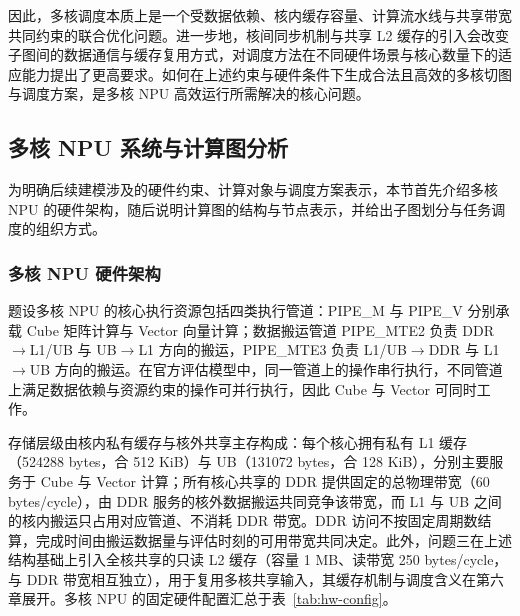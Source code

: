 因此，多核调度本质上是一个受数据依赖、核内缓存容量、计算流水线与共享带宽共同约束的联合优化问题。进一步地，核间同步机制与共享 L2 缓存的引入会改变子图间的数据通信与缓存复用方式，对调度方法在不同硬件场景与核心数量下的适应能力提出了更高要求。如何在上述约束与硬件条件下生成合法且高效的多核切图与调度方案，是多核 NPU 高效运行所需解决的核心问题。

\subsection{多核 NPU 系统与计算图分析}
为明确后续建模涉及的硬件约束、计算对象与调度方案表示，本节首先介绍多核 NPU 的硬件架构，随后说明计算图的结构与节点表示，并给出子图划分与任务调度的组织方式。

\subsubsection{多核 NPU 硬件架构}
题设多核 NPU 的核心执行资源包括四类执行管道：PIPE\_M 与 PIPE\_V 分别承载 Cube 矩阵计算与 Vector 向量计算；数据搬运管道 PIPE\_MTE2 负责 DDR$\rightarrow$L1/UB 与 UB$\rightarrow$L1 方向的搬运，PIPE\_MTE3 负责 L1/UB$\rightarrow$DDR 与 L1$\rightarrow$UB 方向的搬运。在官方评估模型中，同一管道上的操作串行执行，不同管道上满足数据依赖与资源约束的操作可并行执行，因此 Cube 与 Vector 可同时工作。

存储层级由核内私有缓存与核外共享主存构成：每个核心拥有私有 L1 缓存（524288 bytes，合 512 KiB）与 UB（131072 bytes，合 128 KiB），分别主要服务于 Cube 与 Vector 计算；所有核心共享的 DDR 提供固定的总物理带宽（60 bytes/cycle），由 DDR 服务的核外数据搬运共同竞争该带宽，而 L1 与 UB 之间的核内搬运只占用对应管道、不消耗 DDR 带宽。DDR 访问不按固定周期数结算，完成时间由搬运数据量与评估时刻的可用带宽共同决定。此外，问题三在上述结构基础上引入全核共享的只读 L2 缓存（容量 1 MB、读带宽 250 bytes/cycle，与 DDR 带宽相互独立），用于复用多核共享输入，其缓存机制与调度含义在第六章展开。多核 NPU 的固定硬件配置汇总于表~\ref{tab:hw-config}。

